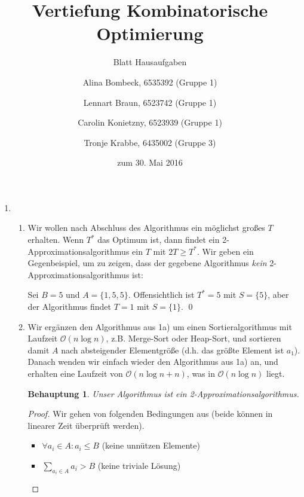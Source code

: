 \documentclass[a4paper]{scrartcl}
\title{Vertiefung Kombinatorische Optimierung}
\subtitle{Blatt {\blattnr} Hausaufgaben}
\author{%
    Alina Bombeck, 6535392 (Gruppe 1) \and
    Lennart Braun, 6523742 (Gruppe 1) \and
    Carolin Konietzny, 6523939 (Gruppe 1) \and
    Tronje Krabbe, 6435002 (Gruppe 3)
}
\date{zum 30. Mai 2016}
\newtheorem*{proposition}{Behauptung}
\newcommand{\Oh}{\mathcal{O}}
\begin{document}
\maketitle


\begin{enumerate}[label=\bfseries \arabic*.]
\item %
\begin{enumerate}
    \item %
        Wir wollen nach Abschluss des Algorithmus ein möglichst großes $T$ erhalten.
        Wenn $T^*$ das Optimum ist, dann findet ein 2-Approximationsalgorithmus
        ein $T$ mit $2T \geq T^*$.
        Wir geben ein Gegenbeispiel, um zu zeigen, dass der gegebene Algorithmus
        \textit{kein} 2-Approximationsalgorithmus ist:

        Sei $B = 5$ und $A = \{1, 5, 5\}$. Offensichtlich ist $T^* = 5$
        mit $S= \{5\}$, aber der Algorithmus findet $T = 1$ mit $S = \{1\}$.
        \qed
    \item %
        Wir ergänzen den Algorithmus aus 1a) um einen Sortieralgorithmus
        mit Laufzeit $\Oh(n \log n)$, z.B. Merge-Sort oder Heap-Sort, und
        sortieren damit $A$ nach absteigender Elementgröße (d.h. das größte
        Element ist $a_1$).
        Danach wenden wir einfach wieder den Algorithmus aus 1a) an, und erhalten
        eine Laufzeit von $\Oh(n \log n + n)$, was in $\Oh(n \log n)$ liegt.
        \\
        \begin{proposition}
        Unser Algorithmus ist ein 2-Approximationsalgorithmus.
        \end{proposition}
        \begin{proof}
            Wir gehen von folgenden Bedingungen aus (beide können in linearer
            Zeit überprüft werden).
            \begin{itemize}
                \item $\forall a_i \in A : a_i \leq B$ (keine unnützen Elemente)
                \item $\sum_{a_i \in A} a_i > B$ (keine triviale Lösung)
            \end{itemize}


\end{proof}
\end{enumerate}
\end{enumerate}
\end{document}

